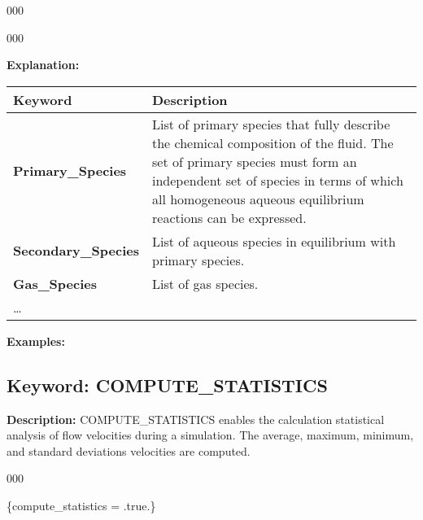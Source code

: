 \documentclass[12pt]{article}
\newcommand\keyend{{(.,\,/,\,END)}}
\begin{document}
\begin{deflist}{000}
\begin{deflist}{000}
\item [\keyend]

\end{deflist}

\item [\keyend]
\end{deflist}

\noindent
{\bf Explanation:}

\begin{center}
\begin{tabularx}{\linewidth}{lX}
\toprule
\bf Keyword & \bf Description\\
\midrule
\bf Primary\_Species & List of primary species that fully describe the chemical composition of the fluid. The set of primary species must form an independent set of species in terms of which all homogeneous aqueous equilibrium reactions can be expressed.\\
\midrule
\bf Secondary\_Species & List of aqueous species in equilibrium with primary species.\\
\midrule
\bf Gas\_Species & List of gas species.\\
\midrule
\ldots & \\
\bottomrule
\end{tabularx}
\end{center}

\bigskip

\noindent
{\bf Examples:}


\newpage
\protect\hypertarget{target_stat}{}

\subsection{Keyword: COMPUTE\_STATISTICS}

\noindent
{\bf Description:}
COMPUTE\_STATISTICS enables the calculation statistical analysis of flow velocities during a simulation.  The average, maximum, minimum, and standard deviations velocities are computed.

\begin{deflist}{000}
\item [COMPUTE\_STATISTICS] \{compute\_statistics = .true.\}
\end{deflist}

\end{document}
